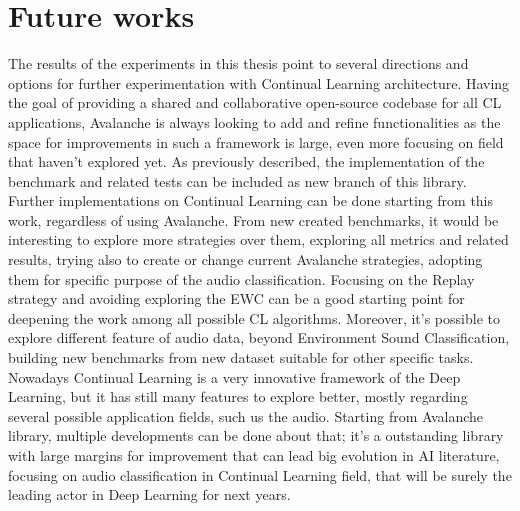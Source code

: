 \documentclass[english, LaM, oneside]{sapthesis}%
\begin{document}
\section{Future works}
The results of the experiments in this thesis point to several directions and options for further experimentation with Continual Learning architecture.
Having the goal of providing a shared and collaborative open-source codebase for all CL applications, Avalanche is always looking to add and refine functionalities as the space for improvements in such a framework is large, even more focusing on field that haven't explored yet.
As previously described, the implementation of the benchmark and related tests can be included as new branch of this library.
\newline \newline
Further implementations on Continual Learning can be done starting from this work, regardless of using Avalanche.  From new created benchmarks, it would be interesting to explore more strategies over them, exploring all metrics and related results, trying also to create or change current Avalanche strategies, adopting them for specific purpose of the audio classification. Focusing on the Replay strategy and avoiding exploring the EWC can be a good starting point for deepening the work among all possible CL algorithms.
Moreover, it's possible to explore different feature of audio data, beyond Environment Sound Classification, building new benchmarks from new dataset suitable for other specific tasks.
\newline \newline
Nowadays Continual Learning is a very innovative framework of the Deep Learning, but it has still many features to explore better, mostly regarding several possible application fields, such us the audio. Starting from Avalanche library, multiple developments can be done about that; it's a outstanding library with large margins for improvement that can lead big evolution in AI literature, focusing on audio classification in Continual Learning field, that will be surely the leading actor in Deep Learning for next years.
\newline \newline
\end{document}
